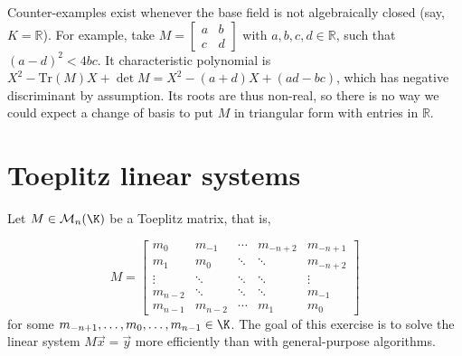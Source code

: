 \documentclass[11pt]{exam}
\theoremstyle{definition}
\begin{document}
{\begin{questions}
\begin{solution}
          Counter-examples exist whenever the base field is not algebraically closed (say, $K=\mathbb{R}$). For example, take $M=\begin{bmatrix} a &b \\ c & d\end{bmatrix}$ with $a,b,c,d \in \mathbb R$, such that $(a-d)^2 < 4bc$. It characteristic polynomial is $X^2-\text{Tr}(M)X+\det M=X^2-(a+d)X+(ad-bc)$, which has negative discriminant by assumption. Its roots are thus non-real, so there is no way we could expect a change of basis to put $M$ in triangular form with entries in $\mathbb R$. 

		
             
	\end{solution}
	
	
\end{questions}

\section{Toeplitz linear systems}

Let $M \in \mathcal{M}_n (\K)$ be a Toeplitz matrix, that is, 

\[ M =
\begin{bmatrix}
m_0 & m_{-1} & \cdots & m_{-n+2} & m_{-n+1} \\
m_1 & m_0 & \ddots & \ddots & m_{-n+2} \\
\vdots & \ddots & \ddots & \ddots & \vdots \\
m_{n-2} & \ddots & \ddots & \ddots & m_{-1} \\
m_{n-1} & m_{n-2} & \cdots & m_1 & m_{0}
\end{bmatrix}
\]
for some $m_{-n+1},\ldots,m_0,\ldots,m_{n-1} \in \K$.
The goal of this exercise is to solve the linear
system $M \vec{x} = \vec{y}$ more efficiently than with general-purpose
algorithms. 
\medskip

}
\end{document}
